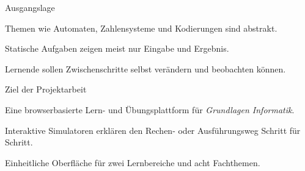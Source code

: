 
\begin{itemframe}{Ausgangslage}
  \item Themen wie Automaten, Zahlensysteme und Kodierungen sind abstrakt.
  \item Statische Aufgaben zeigen meist nur Eingabe und Ergebnis.
  \item Lernende sollen Zwischenschritte selbst verändern und beobachten können.
\end{itemframe}

\begin{itemframe}{Ziel der Projektarbeit}
  \item Eine browserbasierte Lern- und Übungsplattform für \emph{Grundlagen Informatik}.
  \item Interaktive Simulatoren erklären den Rechen- oder Ausführungsweg Schritt für Schritt.
  \item Einheitliche Oberfläche für zwei Lernbereiche und acht Fachthemen.
\end{itemframe}
